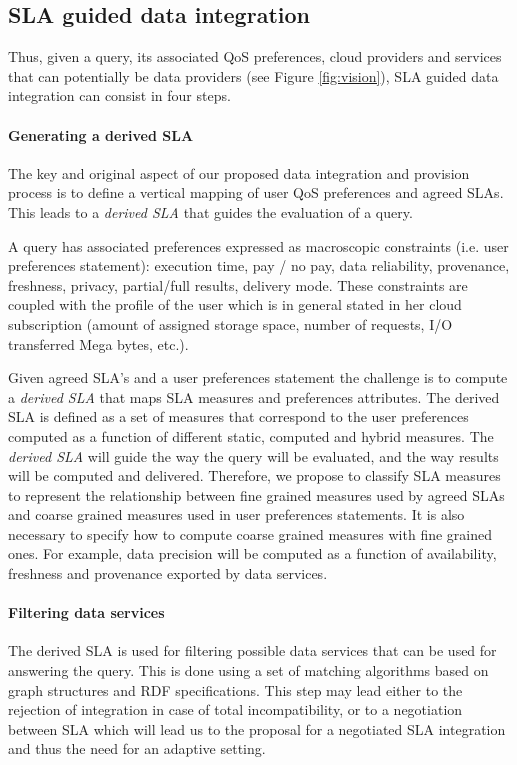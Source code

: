 \subsection{SLA guided data integration}
Thus, given a query, its associated QoS preferences, cloud providers  and  services that can potentially be data providers (see Figure \ref{fig:vision}),  SLA guided data  integration can consist in four steps.  
\paragraph{Generating a derived SLA}  
The key and original aspect of   our proposed data integration and provision process is  to define  a vertical mapping of user QoS preferences and agreed SLAs. This  leads to a {\em derived SLA} that guides the evaluation of a query. 

A query has associated preferences  expressed as macroscopic constraints (i.e. user preferences statement): execution time, pay / no pay, data reliability, provenance, freshness, privacy, partial/full results, delivery mode. These constraints are coupled with the profile of the user which is in general stated in her cloud subscription (amount of assigned storage space, number of requests, I/O transferred Mega bytes, etc.). 

Given agreed SLA's and a user preferences statement the challenge is to compute a  {\em derived SLA} that  maps SLA measures and preferences attributes.  The derived SLA is defined as a set of measures that correspond to the user preferences computed as a function of different static, computed and hybrid measures. The {\em derived SLA}  will guide the way the query will be evaluated, and the way results will be computed and delivered.
Therefore, we propose to classify SLA measures to represent the relationship between fine grained measures used by agreed SLAs and coarse grained measures used in user preferences statements. It is also necessary to specify how to compute coarse grained measures with fine grained ones. For example, data precision will be computed as a function of availability, freshness and provenance exported by data services. 

  
\paragraph{Filtering data services} 
The derived SLA  is used for filtering possible data services that can be used for answering the query. This is done using a set of matching algorithms based on  graph structures and RDF specifications. This step may lead either to the rejection of integration in case of total incompatibility, or to a negotiation between SLA which will lead us to the proposal for a negotiated SLA integration and thus the need for an adaptive setting.


